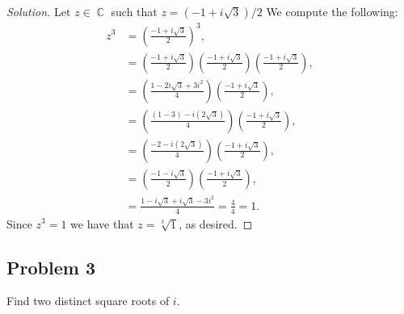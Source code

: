 \documentclass[letterpaper, 12pt]{amsart}
\DeclareMathOperator{\C}{\mathbb{C}}
\theoremstyle{definition}  %
\begin{document}
		\begin{proof}[Solution]
		Let $z \in \C$ such that $z = (-1 + i\sqrt{3})/2$
		We compute the following:
			\begin{align*}
			z^{3} &= \left( \frac{-1 + i\sqrt{3}}{2} \right)^{3}, \\
			&= \left( \frac{-1 + i\sqrt{3}}{2} \right) \left( \frac{-1 + i\sqrt{3}}{2} \right) \left( \frac{-1 + i\sqrt{3}}{2} \right), \\
			&= \left( \frac{1 - 2i\sqrt{3} + 3i^{2}}{4} \right) \left( \frac{-1 + i\sqrt{3}}{2} \right), \\
			&= \left( \frac{(1 - 3) - i(2\sqrt{3})}{4} \right) \left( \frac{-1 + i\sqrt{3}}{2} \right), \\
			&= \left( \frac{ -2 - i(2\sqrt{3})}{4} \right) \left( \frac{-1 + i\sqrt{3}}{2} \right), \\
			&= \left( \frac{ -1 - i\sqrt{3}}{2} \right) \left( \frac{-1 + i\sqrt{3}}{2} \right), \\
			&= \frac{1 - i\sqrt{3} + i\sqrt{3} - 3i^{2}}{4} = \frac{4}{4} = 1.
			\end{align*}
		Since $z^{3} = 1$ we have that $z = \sqrt[3]{1}$, as desired.			
		\end{proof}

		\subsection*{Problem 3}
		Find two distinct square roots of $i$.
\end{document}
